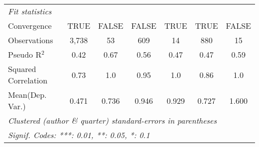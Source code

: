 \begin{tabular}{lcccccc}
   \midrule
   \emph{Fit statistics}\\
   Convergence                                                &TRUE           & FALSE   & FALSE        & TRUE           & TRUE          & FALSE\\  
   Observations                                               & 3,738         & 53      & 609          & 14             & 880           & 15\\  
   Pseudo R$^2$                                               & 0.42          & 0.67    & 0.56         & 0.47           & 0.47          & 0.59\\  
   Squared Correlation                                        & 0.73          & 1.0     & 0.95         & 1.0            & 0.86          & 1.0\\  
Mean(Dep. Var.) & 0.471 & 0.736 & 0.946 & 0.929 & 0.727 & 1.600 \\
   \midrule \midrule
   \multicolumn{7}{l}{\emph{Clustered (author \& quarter) standard-errors in parentheses}}\\
   \multicolumn{7}{l}{\emph{Signif. Codes: ***: 0.01, **: 0.05, *: 0.1}}\\
\end{tabular}
\par\endgroup
